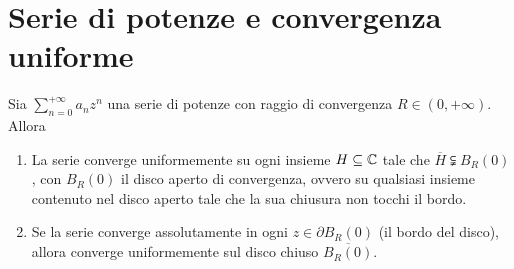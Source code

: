 \section{Serie di potenze e convergenza uniforme}
\begin{theorema}\label{convergenzasottoinsiemeH}
	Sia $\displaystyle\sum_{n=0}^{+\infty}a_nz^n$ una serie di potenze con raggio di convergenza $R\in\left(0,+\infty\right)$. Allora
	\begin{enumerate} %
		\item La serie converge uniformemente su ogni insieme $H\subseteq\mathbb{C}$ tale che $\overline{H}\subsetneqq B_R\left(0\right)$, con $B_R\left(0\right)$ il disco aperto di convergenza, ovvero su qualsiasi insieme contenuto nel disco aperto tale che la sua chiusura non tocchi il bordo.
		\item Se la serie converge assolutamente in ogni $z\in\partial B_R\left(0\right)$ (il bordo del disco), allora converge uniformemente sul disco chiuso $\overline{B_R\left(0\right)}$.
	\end{enumerate}
\end{theorema}
